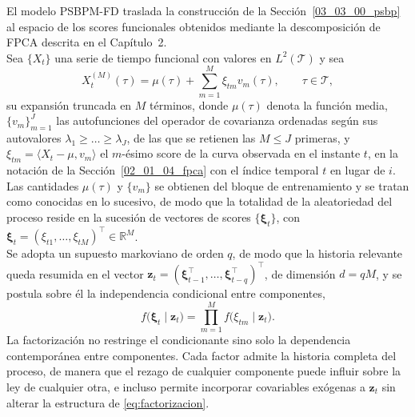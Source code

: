 El modelo PSBPM-FD traslada la construcción de la Sección~\ref{03_03_00_psbp} al espacio de los scores funcionales obtenidos mediante la descomposición de FPCA descrita en el Capítulo~2.\\

Sea $\{X_t\}$ una serie de tiempo funcional con valores en $L^2(\mathcal{T})$ y sea
\begin{equation}\label{eq:expansion_kl_truncada}
    X_t^{(M)}(\tau) = \mu(\tau)
    + \sum_{m=1}^{M} \xi_{tm}v_m(\tau),
    \qquad \tau \in \mathcal{T},
\end{equation}
su expansión truncada en $M$ términos, donde $\mu(\tau)$ denota la función media, $\{v_m\}_{m=1}^{J}$ las autofunciones del operador de covarianza ordenadas según sus autovalores $\lambda_1 \geq \dots \geq \lambda_J$, de las que se retienen las $M \leq J$ primeras, y $\xi_{tm} = \langle X_t - \mu, v_m\rangle$ el $m$-ésimo score de la curva observada en el instante $t$, en la notación de la Sección~\ref{02_01_04_fpca} con el índice temporal $t$ en lugar de $i$. Las cantidades $\mu(\tau)$ y $\{v_m\}$ se obtienen del bloque de entrenamiento y se tratan como conocidas en lo sucesivo, de modo que la totalidad de la aleatoriedad del proceso reside en la sucesión de vectores de scores $\{\boldsymbol{\xi}_t\}$, con $\boldsymbol{\xi}_t = (\xi_{t1},\dots,\xi_{tM})^\top \in \mathbb{R}^{M}$.\\

Se adopta un supuesto markoviano de orden $q$, de modo que la historia relevante queda resumida en el vector $\mathbf{z}_t = (\boldsymbol{\xi}_{t-1}^\top, \dots, \boldsymbol{\xi}_{t-q}^\top)^\top$, de dimensión $d = qM$, y se postula sobre él la independencia condicional entre componentes,
\begin{equation}\label{eq:factorizacion}
    f\bigl(\boldsymbol{\xi}_t \mid \mathbf{z}_t\bigr)
    = \prod_{m=1}^{M} f\bigl(\xi_{tm} \mid \mathbf{z}_t\bigr).
\end{equation}
La factorización no restringe el condicionante sino solo la dependencia contemporánea entre componentes. Cada factor admite la historia completa del proceso, de manera que el rezago de cualquier componente puede influir sobre la ley de cualquier otra, e incluso permite incorporar covariables exógenas a $\mathbf{z}_t$ sin alterar la estructura de \eqref{eq:factorizacion}.\\

